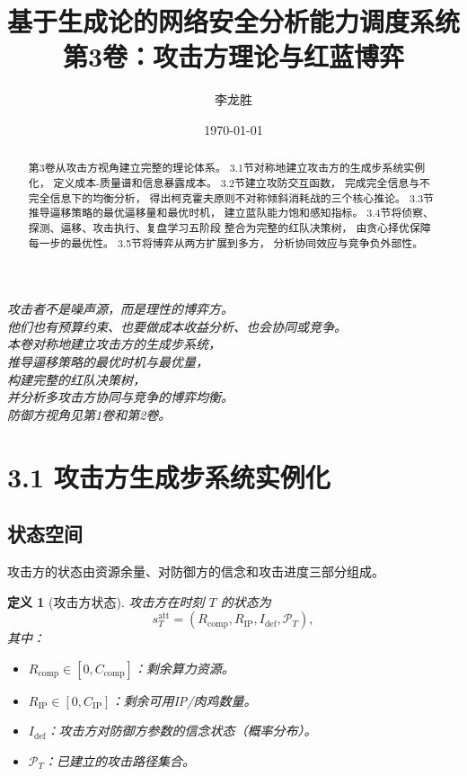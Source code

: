 \documentclass[11pt,a4paper]{article}
\title{基于生成论的网络安全分析能力调度系统\\
第3卷：攻击方理论与红蓝博弈}
\author{李龙胜}
\date{\today}
\newtheorem{definition}{定义}[section]
\begin{document}
\maketitle

\begin{center}
\textit{
攻击者不是噪声源，而是理性的博弈方。\\
他们也有预算约束、也要做成本收益分析、也会协同或竞争。\\
本卷对称地建立攻击方的生成步系统，\\
推导逼移策略的最优时机与最优量，\\
构建完整的红队决策树，\\
并分析多攻击方协同与竞争的博弈均衡。\\
防御方视角见第1卷和第2卷。
}
\end{center}

\vspace{5mm}

\begin{abstract}
第3卷从攻击方视角建立完整的理论体系。
3.1节对称地建立攻击方的生成步系统实例化，
定义成本-质量谱和信息暴露成本。
3.2节建立攻防交互函数，
完成完全信息与不完全信息下的均衡分析，
得出柯克霍夫原则不对称倾斜消耗战的三个核心推论。
3.3节推导逼移策略的最优逼移量和最优时机，
建立蓝队能力饱和感知指标。
3.4节将侦察、探测、逼移、攻击执行、复盘学习五阶段
整合为完整的红队决策树，
由贪心择优保障每一步的最优性。
3.5节将博弈从两方扩展到多方，
分析协同效应与竞争负外部性。
\end{abstract}

\tableofcontents

\section{3.1 攻击方生成步系统实例化}

\subsection{状态空间}

攻击方的状态由资源余量、对防御方的信念和攻击进度三部分组成。

\begin{definition}[攻击方状态]
攻击方在时刻 $T$ 的状态为
\[
s_T^{\text{att}} = (R_{\text{comp}}, R_{\text{IP}}, I_{\text{def}}, \mathcal{P}_T),
\]
其中：
\begin{itemize}
    \item $R_{\text{comp}} \in [0, C_{\text{comp}}]$：剩余算力资源。
    \item $R_{\text{IP}} \in [0, C_{\text{IP}}]$：剩余可用IP/肉鸡数量。
    \item $I_{\text{def}}$：攻击方对防御方参数的信念状态（概率分布）。
    \item $\mathcal{P}_T$：已建立的攻击路径集合。
\end{itemize}
\end{definition}
\end{document}
